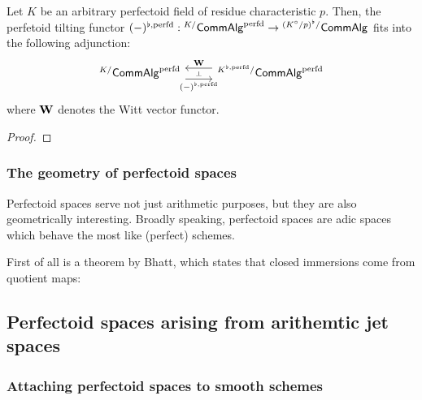                 \begin{proposition} \label{prop: witt_tilt_adjunction}
                    Let $K$ be an arbitrary perfectoid field of residue characteristic $p$. Then, the perfetoid tilting functor $(-)^{\flat, \mathrm{perfd}}: {}^{K/}\mathsf{Comm}\mathsf{Alg}^{\mathrm{perfd}} \to {}^{(K^{\circ}/p)^{\flat}/}\mathsf{Comm}\mathsf{Alg}$ fits into the following adjunction:
                        $$
                            \begin{tikzcd}
                            	{{}^{K/}\Comm\Alg^{\perfd}} & {{}^{K^{\flat, \perfd}/}\Comm\Alg^{\perfd}}
                            	\arrow[""{name=0, anchor=center, inner sep=0}, "{(-)^{\flat, \perfd}}"', shift right=2, from=1-1, to=1-2]
                            	\arrow[""{name=1, anchor=center, inner sep=0}, "\W"', shift right=2, from=1-2, to=1-1]
                            	\arrow["\dashv"{anchor=center, rotate=-90}, draw=none, from=1, to=0]
                            \end{tikzcd}
                        $$
                    where $\mathbf{W}$ denotes the Witt vector functor.
                \end{proposition}
                    \begin{proof}
                        
                    \end{proof}
                    
            \subsubsection{The geometry of perfectoid spaces}
                Perfectoid spaces serve not just arithmetic purposes, but they are also geometrically interesting. Broadly speaking, perfectoid spaces are adic spaces which behave the most like (perfect) schemes.
                
                First of all is a theorem by Bhatt, which states that closed immersions come from quotient maps:
                    
        \subsection{Perfectoid spaces arising from arithemtic jet spaces}
                
            \subsubsection{Attaching perfectoid spaces to smooth schemes}
                
